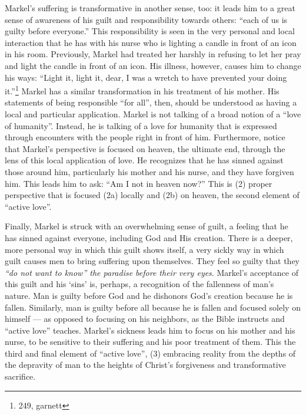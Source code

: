         
        Markel's suffering is transformative in another sense, too: it leads him to a great sense of awareness of his guilt and responsibility towards others: ``each of us is guilty before everyone.'' This responsibility is seen in the very personal and local interaction that he has with his nurse who is lighting a candle in front of an icon in his room. Previously, Markel had treated her harshly in refusing to let her pray and light the candle in front of an icon. His illness, however, causes him to change his ways: ``Light it, light it, dear, I was a wretch to have prevented your doing it.''\footnote{249, garnett} Markel has a similar transformation in his treatment of his mother. His statements of being responsible ``for all'', then, should be understood as having a local and particular application. Markel is not talking of a broad notion of a ``love of humanity''. Instead, he is talking of a love for humanity that is expressed through encounters with the people right in front of him. Furthermore, notice that Markel's perspective is focused on heaven, the ultimate end, through the lens of this local application of love. He recognizes that he has sinned against those around him, particularly his mother and his nurse, and they have forgiven him. This leads him to ask: ``Am I not in heaven now?'' This is (2) proper perspective that is focused (2a) locally and (2b) on heaven, the second element of ``active love''.
        
        Finally, Markel is struck with an overwhelming sense of guilt, a feeling that he has sinned against everyone, including God and His creation. There is a deeper, more personal way in which this guilt shows itself, a very sickly way in which guilt causes men to bring suffering upon themselves. They feel so guilty that they \emph{``do not want to know'' the paradise before their very eyes}. Markel's acceptance of this guilt and his `sins' is, perhaps, a recognition of the fallenness of man's nature. Man is guilty before God and he dishonors God's creation because he is fallen.  Similarly, man is guilty before all because he is fallen and focused solely on himself --- as opposed to focusing on his neighbors, as the Bible instructs and ``active love'' teaches.  Markel's sickness leads him to focus on his mother and his nurse, to be sensitive to their suffering and his poor treatment of them. This the third and final element of ``active love'', (3) embracing reality from the depths of the depravity of man to the heights of Christ's forgiveness and transformative sacrifice. 
        
